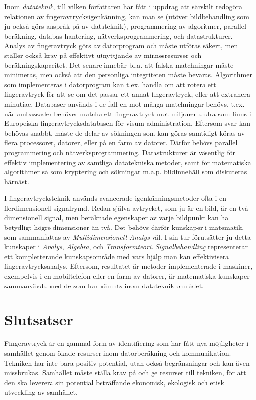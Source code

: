 \documentclass{article}
\begin{document}
Inom  {\em datateknik}, till vilken författaren har fått i uppdrag att
särskilt redogöra relationen av fingeravtrycksigenkänning, kan man  se
(utöver bildbehandling som ju också görs anspråk på av datateknik), 
programmering av algoritmer, parallel beräkning,
databas hantering, nätverksprogrammering, och datastrukturer. Analys av fingeravtryck görs av datorprogram och måste utföras säkert, men ställer också krav på effektivt utnyttjande av minnesresurser och beräkningskapacitet.
  Det senare  innebär  bl.a. att  falska matchningar måste
minimeras, men också att den  personliga integriteten  måste bevaras. 
Algorithmer som implementeras i datorprogram kan t.ex. handla om att rotera ett fingeravtryck för att
se om 
det passar ett annat fingeravtryck, eller  att extrahera 
minutiae. Databaser används i de fall en-mot-många matchningar behövs,
t.ex. när  ambassader behöver 
 matcha ett
fingeravtryck mot miljoner  andra som finns i Europeiska fingeravtrycksdatabasen för visum
administration. Eftersom svar kan behövas snabbt,  måste de delar av
sökningen som kan göras samtidigt köras av flera processorer, 
datorer, eller på en farm  av datorer. Därför  behövs parallel
programmering och nätverksprogrammering.  Datastrukturer är väsentlig
för effektiv implementering av samtliga datatekniska metoder, samt för 
matematiska algorithmer så som kryptering och sökningar m.a.p. bildinnehåll som
diskuteras härnäst.


I fingeravtrycksteknik används avancerade igenkänningsmetoder ofta i en
flerdimensionell signalrymd. Redan själva avtrycket, som ju  är  en
bild, är  en
två dimensionell signal, men beräknade egenskaper av varje bildpunkt kan ha betydligt
högre dimensioner än två.
Det behövs därför kunskaper i matematik, som sammanfattas av 
{\em Multidimensionell Analys} väl. I sin
tur förutsätter ju detta  kunskaper i {\em Analys},   {\em Algebra},
och {\em Transformteori}. {\em Signalbehandling}
representerar ett kompletterande kunskapsområde med vars hjälp man kan
effektivisera fingeravtrycksanalys. Eftersom, resultatet är metoder
implementerade i maskiner, exempelvis i en mobiltelefon eller en
farm av datorer, är matematiska kunskaper sammanvävda med de som har nämnts
inom datateknik området. 


\section{Slutsatser}
\label{sc:conclusion} 
Fingeravtryck är en gammal form av identifiering som har fått nya möjligheter i samhället genom ökade resurser inom
datorberäkning  och kommunikation. Tekniken har  inte bara
positiv potential, utan också  begränsningar och kan även
missbrukas. Samhället måste ställa krav på och ge resurser
till tekniken, för att den ska
leverera sin  potential   beträffande ekonomisk, ekologisk
och etisk utveckling av samhället. 
\end{document}
